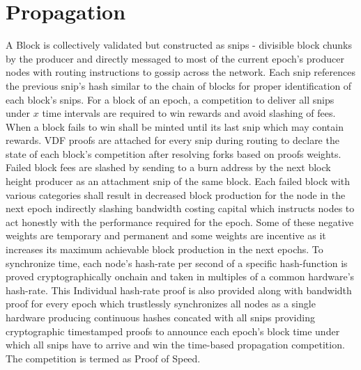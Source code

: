 \documentclass[a4paper,10pt]{article}
\begin{document}
\section{Propagation}
A Block is collectively validated but constructed as snips - divisible block chunks by the producer and directly messaged to most of the current epoch's producer nodes with routing instructions to gossip across the network. Each snip references the previous snip's hash similar to the chain of blocks for proper identification of each block's snips. For a block of an epoch, a competition to deliver all snips under $x$ time intervals are required to win rewards and avoid slashing of fees. When a block fails to win shall be minted until its last snip which may contain rewards. VDF proofs are attached for every snip during routing to declare the state of each block's competition after resolving forks based on proofs weights. Failed block fees are slashed by sending to a burn address by the next block height producer as an attachment snip of the same block. Each failed block with various categories shall result in decreased block production for the node in the next epoch indirectly slashing bandwidth costing capital which instructs nodes to act honestly with the performance required for the epoch. Some of these negative weights are temporary and permanent and some weights are incentive as it increases its maximum achievable block production in the next epochs. To synchronize time, each node's hash-rate per second of a specific hash-function is proved cryptographically onchain and taken in multiples of a common hardware's hash-rate. This Individual hash-rate proof is also provided along with bandwidth proof for every epoch which trustlessly synchronizes all nodes as a single hardware producing continuous hashes concated with all snips providing cryptographic timestamped proofs to announce each epoch's block time under which all snips have to arrive and win the time-based propagation competition. The competition is termed as Proof of Speed.
\end{document}
